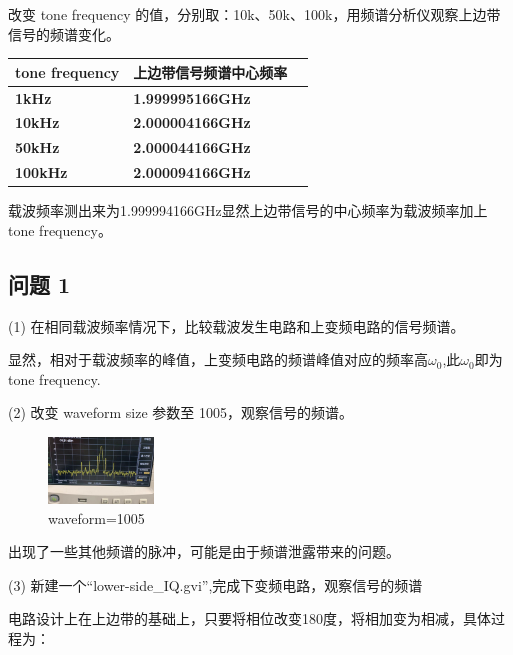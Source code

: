 \documentclass{../source/Experiment}
\begin{document}
        改变 tone frequency 的值，分别取：10k、50k、100k，用频谱分析仪观察上边带 信号的频谱变化。
        \begin{table}[H]
            \centering
            \begin{tabular}{|l|l|l|}
            \hline
            \textbf{tone frequency} & \textbf{上边带信号频谱中心频率}     \\ \hline
            \textbf{1kHz}           & \textbf{1.999995166GHz}  \\ \hline
            \textbf{10kHz}          & \textbf{2.000004166GHz}    \\ \hline
            \textbf{50kHz}          & \textbf{2.000044166GHz}     \\ \hline
            \textbf{100kHz}         & \textbf{2.000094166GHz}    \\ \hline
            \end{tabular}
            \end{table}
            
            载波频率测出来为1.999994166GHz显然上边带信号的中心频率为载波频率加上tone frequency。
        \subsection{问题 1}
        (1) 在相同载波频率情况下，比较载波发生电路和上变频电路的信号频谱。 
        
            显然，相对于载波频率的峰值，上变频电路的频谱峰值对应的频率高$\omega_0$,此$\omega_0$即为tone frequency.

        (2) 改变 waveform size 参数至 1005，观察信号的频谱。 
        
        \begin{figure}[H]
            \centering
            \includegraphics[width = 0.25\textwidth]{lab9/wave.png}
            \caption{waveform=1005}
        \end{figure}
        出现了一些其他频谱的脉冲，可能是由于频谱泄露带来的问题。

        (3) 新建一个“lower-side\_IQ.gvi”,完成下变频电路，观察信号的频谱 
        
        电路设计上在上边带的基础上，只要将相位改变180度，将相加变为相减，具体过程为：
       
\end{document}
